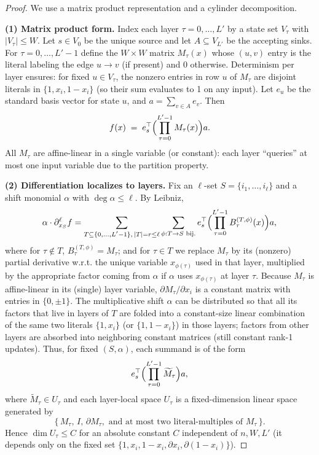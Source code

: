 \documentclass[12pt]{article}
\theoremstyle{definition}
\theoremstyle{definition}
\theoremstyle{remark}
\theoremstyle{remark}
\begin{document}
\begin{proof}
We use a matrix product representation and a cylinder decomposition.

\textbf{(1) Matrix product form.}
Index each layer $\tau = 0, \ldots, L'$ by a state set $V_\tau$ with $|V_\tau| \le W$. Let $s \in V_0$ be the unique source and let $A \subseteq V_{L'}$ be the accepting sinks. For $\tau = 0, \ldots, L'-1$ define the $W \times W$ matrix $M_\tau(x)$ whose $(u,v)$ entry is the literal labeling the edge $u \to v$ (if present) and $0$ otherwise. Determinism per layer ensures: for fixed $u \in V_\tau$, the nonzero entries in row $u$ of $M_\tau$ are disjoint literals in $\{1, x_i, 1-x_i\}$ (so their sum evaluates to 1 on any input). Let $e_u$ be the standard basis vector for state $u$, and $a = \sum_{v \in A} e_v$. Then
\[
f(x) \;=\; e_s^\top \Bigl(\prod_{\tau=0}^{L'-1} M_\tau(x)\Bigr) a.
\]
All $M_\tau$ are affine-linear in a single variable (or constant): each layer ``queries'' at most one input variable due to the partition property.

\textbf{(2) Differentiation localizes to layers.}
Fix an $\ell$-set $S = \{i_1, \ldots, i_\ell\}$ and a shift monomial $\alpha$ with $\deg \alpha \le \ell$. By Leibniz,
\[
\alpha \cdot \partial_{x_S}^\ell f = \sum_{\substack{T \subseteq \{0,\ldots,L'-1\},\, |T| = r \le \ell}} \sum_{\phi: T \to S\text{ bij.}} e_s^\top \Bigl(\prod_{\tau=0}^{L'-1} B_\tau^{(T,\phi)}(x)\Bigr) a,
\]
where for $\tau \notin T$, $B_\tau^{(T,\phi)} = M_\tau$; and for $\tau \in T$ we replace $M_\tau$ by its (nonzero) partial derivative w.r.t. the unique variable $x_{\phi(\tau)}$ used in that layer, multiplied by the appropriate factor coming from $\alpha$ if $\alpha$ uses $x_{\phi(\tau)}$ at layer $\tau$. Because $M_\tau$ is affine-linear in its (single) layer variable, $\partial M_\tau/\partial x_i$ is a constant matrix with entries in $\{0, \pm 1\}$. The multiplicative shift $\alpha$ can be distributed so that all its factors that live in layers of $T$ are folded into a constant-size linear combination of the same two literals $\{1, x_i\}$ (or $\{1, 1-x_i\}$) in those layers; factors from other layers are absorbed into neighboring constant matrices (still constant rank-1 updates). Thus, for fixed $(S,\alpha)$, each summand is of the form
\[
e_s^\top \Bigl(\prod_{\tau=0}^{L'-1} \widetilde{M}_\tau\Bigr) a,
\]
where $\widetilde{M}_\tau \in U_\tau$ and each layer-local space $U_\tau$ is a fixed-dimension linear space generated by
\[
\{\, M_\tau,\, I,\, \partial M_\tau,\text{ and at most two literal-multiples of }M_\tau\,\}.
\]
Hence $\dim U_\tau \le C$ for an absolute constant $C$ independent of $n, W, L'$ (it depends only on the fixed set $\{1, x_i, 1-x_i, \partial x_i, \partial(1-x_i)\}$).


\end{proof}
\end{document}

